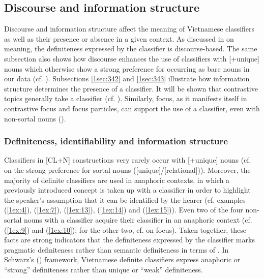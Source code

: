 \documentclass[output=paper]{langsci/langscibook}
\begin{document}
\subsection{Discourse and information structure}\label{1sec:34}
Discourse and information structure affect the meaning of Vietnamese classifiers as well as their presence or absence in a given context. As discussed in  on meaning, the definiteness expressed by the classifier is discourse-based. The same subsection also shows how discourse enhances the use of classifiers with [+unique] nouns which otherwise show a strong preference for occurring as bare nouns in our data (cf. ). Subsections \ref{1sec:342} and \ref{1sec:343} illustrate how information structure determines the presence of a classifier. It will be shown that contrastive topics generally take a classifier (cf. ). Similarly, focus, as it manifests itself in contrastive focus and focus particles, can support the use of a classifier, even with non-sortal nouns ().


\subsubsection{Definiteness, identifiability and information structure}\label{1sec:341}
Classifiers in [CL+N] constructions  very rarely  occur  with [+unique] nouns (cf.  on the strong preference for sortal nouns ([\minus unique]/[\minus relation\-al])). Moreover, the majority of definite classifiers are used in anaphoric contexts, in which a previously introduced concept is taken up with a classifier in order to highlight the speaker's assumption that it can be identified by the hearer (cf. examples (\ref{1ex:4}), (\ref{1ex:7}), (\ref{1ex:13}), (\ref{1ex:14}) and (\ref{1ex:15})). Even two of the four non-sortal nouns with a classifier acquire their classifier in an anaphoric context (cf. (\ref{1ex:9}) and (\ref{1ex:10}); for the other two, cf.  on focus). Taken together, these facts are strong indicators that the definiteness expressed by the classifier marks pragmatic definiteness rather than semantic definiteness in terms of \cite{lobner:85}. In Schwarz's (\citeyear{schwarz:09,schwarz:13}) framework, Vietnamese definite classifiers express anaphoric or ``strong'' definiteness rather than unique or ``weak'' definiteness.
\end{document}
